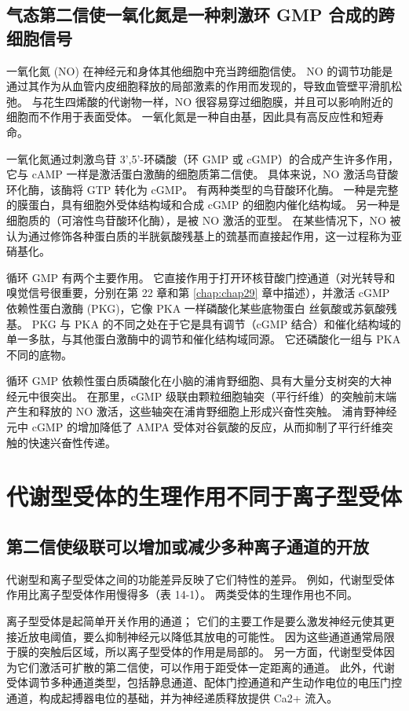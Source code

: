 \subsection{气态第二信使一氧化氮是一种刺激环 GMP 合成的跨细胞信号}

一氧化氮 (NO) 在神经元和身体其他细胞中充当跨细胞信使。 
NO 的调节功能是通过其作为从血管内皮细胞释放的局部激素的作用而发现的，导致血管壁平滑肌松弛。
与花生四烯酸的代谢物一样，NO 很容易穿过细胞膜，并且可以影响附近的细胞而不作用于表面受体。
一氧化氮是一种自由基，因此具有高反应性和短寿命。


一氧化氮通过刺激鸟苷 3',5'-环磷酸（环 GMP 或 cGMP）的合成产生许多作用，它与 cAMP 一样是激活蛋白激酶的细胞质第二信使。
具体来说，NO 激活鸟苷酸环化酶，该酶将 GTP 转化为 cGMP。 
有两种类型的鸟苷酸环化酶。 
一种是完整的膜蛋白，具有细胞外受体结构域和合成 cGMP 的细胞内催化结构域。
另一种是细胞质的（可溶性鸟苷酸环化酶），是被 NO 激活的亚型。
在某些情况下，NO 被认为通过修饰各种蛋白质的半胱氨酸残基上的巯基而直接起作用，这一过程称为亚硝基化。


循环 GMP 有两个主要作用。 它直接作用于打开环核苷酸门控通道（对光转导和嗅觉信号很重要，分别在第 22 章和第 \ref{chap:chap29} 章中描述），并激活 cGMP 依赖性蛋白激酶 (PKG)，它像 PKA 一样磷酸化某些底物蛋白 丝氨酸或苏氨酸残基。 
PKG 与 PKA 的不同之处在于它是具有调节（cGMP 结合）和催化结构域的单一多肽，与其他蛋白激酶中的调节和催化结构域同源。 
它还磷酸化一组与 PKA 不同的底物。


循环 GMP 依赖性蛋白质磷酸化在小脑的浦肯野细胞、具有大量分支树突的大神经元中很突出。
在那里，cGMP 级联由颗粒细胞轴突（平行纤维）的突触前末端产生和释放的 NO 激活，这些轴突在浦肯野细胞上形成兴奋性突触。 
浦肯野神经元中 cGMP 的增加降低了 AMPA 受体对谷氨酸的反应，从而抑制了平行纤维突触的快速兴奋性传递。



\section{代谢型受体的生理作用不同于离子型受体}

\subsection{第二信使级联可以增加或减少多种离子通道的开放}
代谢型和离子型受体之间的功能差异反映了它们特性的差异。 
例如，代谢型受体作用比离子型受体作用慢得多（表 14-1）。 
两类受体的生理作用也不同。


离子型受体是起简单开关作用的通道； 
它们的主要工作是要么激发神经元使其更接近放电阈值，要么抑制神经元以降低其放电的可能性。 
因为这些通道通常局限于膜的突触后区域，所以离子型受体的作用是局部的。 
另一方面，代谢型受体因为它们激活可扩散的第二信使，可以作用于距受体一定距离的通道。 
此外，代谢受体调节多种通道类型，包括静息通道、配体门控通道和产生动作电位的电压门控通道，构成起搏器电位的基础，并为神经递质释放提供 Ca2+ 流入。


